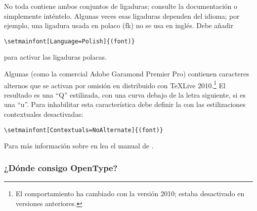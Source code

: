 
No toda \fontnomo{} contiene ambos conjuntos de ligaduras; consulte
la documentación o simplemente inténtelo. Algunas veces esas ligaduras
dependen del idioma; por ejemplo, una ligadura usada en polaco (fk) no se
usa en inglés. 
Debe añadir
\begin{code}
\begin{verbatim}
\setmainfont[Language=Polish]{(font)}
\end{verbatim}
\end{code}
para activar las ligaduras polacas.


Algunas \fontsnomo{} (como la comercial Adobe Garamond Premier Pro) 
contienen caracteres alternos que se activan por omisión en  distribuido con \TeX Live 2010.\footnote{El comportamiento ha cambiado con la versión 2010; estaba desactivado en versiones anteriores.} 
El resultado es una ``Q'' estilizada, con una curva debajo de la letra siguiente, si es una ``u''.
Para inhabilitar esta característica debe definir la \fontnomo{} con 
las estilizaciones contextuales desactivadas:
\begin{code}
\begin{verbatim}
\setmainfont[Contextuals=NoAlternate]{(font)}
\end{verbatim}
\end{code}

Para más información sobre \fontsnomo{} en  lea el manual de .

\subsubsection{¿Dónde consigo \fontsnomo{} OpenType?}

